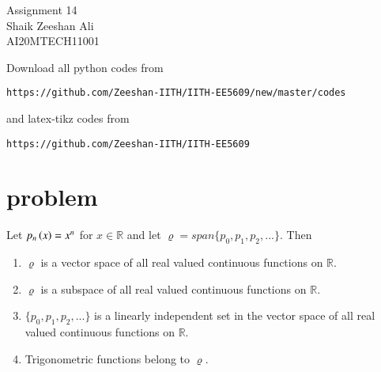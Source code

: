 \documentclass[journal,12pt]{IEEEtran}
\begin{document}
\renewcommand{\thefigure}{\theproblem}
\def\putbox#1#2#3{\makebox[0in][l]{\makebox[#1][l]{}\raisebox{\baselineskip}[0in][0in]{\raisebox{#2}[0in][0in]{#3}}}}
     \def\rightbox#1{\makebox[0in][r]{#1}}
     \def\centbox#1{\makebox[0in]{#1}}
     \def\topbox#1{\raisebox{-\baselineskip}[0in][0in]{#1}}
     \def\midbox#1{\raisebox{-0.5\baselineskip}[0in][0in]{#1}}
\vspace{2cm}
\begin{center}
\huge Assignment 14\\
\large Shaik Zeeshan Ali\\
\large AI20MTECH11001\\
\end{center}
Download all python codes from 
\begin{lstlisting}
https://github.com/Zeeshan-IITH/IITH-EE5609/new/master/codes
\end{lstlisting}
and latex-tikz codes from 
\begin{lstlisting}
https://github.com/Zeeshan-IITH/IITH-EE5609
\end{lstlisting}
\section{problem}
Let $p_n\left(x\right)=x^n$ for $x\in\mathbb{R}$ and let $\varrho=span\{p_0,p_1,p_2,...\}$. Then
\begin{enumerate}
    \item $\varrho$ is a vector space of all real valued continuous functions on $\mathbb{R}$.
    \item $\varrho$ is a subspace of all real valued continuous functions on $\mathbb{R}$.
    \item $\{p_0,p_1,p_2,...\}$ is a linearly independent set in the vector space of all real valued continuous functions on $\mathbb{R}$.
    \item Trigonometric functions belong to $\varrho$.
\end{enumerate}
\end{document}
